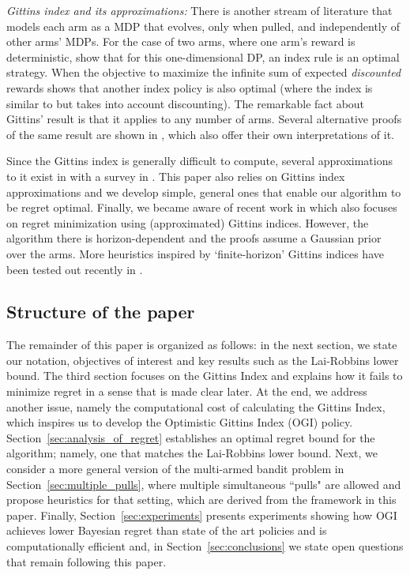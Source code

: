 \noindent\emph{Gittins index and its approximations: }
There is another stream of literature that models each arm as a MDP that evolves, only when pulled,  and independently of other arms' MDPs. For the case of two arms, where one arm's reward is deterministic, \cite{bradt1956sequential} show that for this one-dimensional DP, an index rule is an optimal strategy. When the objective to maximize the infinite sum of expected \emph{discounted} rewards \cite{gittins1979bandit} shows that another index policy is also optimal (where the index is similar to \cite{bradt1956sequential} but takes into account discounting). The remarkable fact about Gittins' result is that it applies to any number of arms. Several alternative proofs of the same result are shown in \cite{tsitsiklis1994short,weber1992gittins,whittle1980multi,bertsimas1996conservation}, which also offer their own interpretations of it. 
 
Since the Gittins index is generally difficult to compute, several approximations to it exist in \cite{yao2006some,katehakis1987multi,varaiya1985extensions} with a survey in \cite{chakravorty2013multi}. This paper also relies on Gittins index approximations and we develop simple, general ones that enable our algorithm to be regret optimal. Finally, we became aware of recent work in \cite{lattimore2016bayesregret} which also focuses on regret minimization using (approximated) Gittins indices. However, the algorithm there is horizon-dependent and the proofs assume a Gaussian prior over the arms. More heuristics inspired by `finite-horizon' Gittins indices have been tested out recently in \cite{kaufmann2016bayesian}.

\subsection{Structure of the paper}
The remainder of this paper is organized as follows: in the next section, we state our notation, objectives of interest 
and key results such as the Lai-Robbins lower bound. The third section focuses on the Gittins Index and explains how it fails to minimize regret in a sense that is made clear later. At the end, we address another issue, namely the computational cost of calculating the Gittins Index, which inspires us to develop the Optimistic Gittins Index (OGI) policy. Section~\ref{sec:analysis_of_regret} establishes an optimal regret bound for the algorithm; namely, one that matches the Lai-Robbins lower bound. Next, we consider a more general version of the multi-armed bandit problem in Section~\ref{sec:multiple_pulls}, where multiple simultaneous ``pulls" are allowed and propose heuristics for that setting, which are derived from the framework in this paper. Finally, Section~\ref{sec:experiments} presents experiments showing how OGI achieves lower Bayesian regret than state of the art policies and is computationally efficient and, in Section~\ref{sec:conclusions} we state open questions that remain following this paper.
